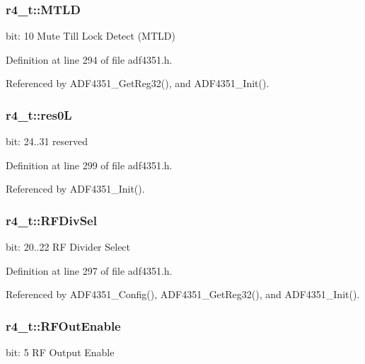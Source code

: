 \subsubsection[{\texorpdfstring{M\+T\+LD}{MTLD}}]{ r4\+\_\+t\+::\+M\+T\+LD}\hypertarget{structr4__t_a899217c98d1c1eca8780186c8e44470c}{}\label{structr4__t_a899217c98d1c1eca8780186c8e44470c}
bit\+: 10 Mute Till Lock Detect (M\+T\+LD) 

Definition at line 294 of file adf4351.\+h.



Referenced by A\+D\+F4351\+\_\+\+Get\+Reg32(), and A\+D\+F4351\+\_\+\+Init().

\subsubsection[{\texorpdfstring{res0L}{res0L}}]{ r4\+\_\+t\+::res0L}\hypertarget{structr4__t_a39447a9d51f096493dfc6d4a38bf3f9e}{}\label{structr4__t_a39447a9d51f096493dfc6d4a38bf3f9e}
bit\+: 24..31 reserved 

Definition at line 299 of file adf4351.\+h.



Referenced by A\+D\+F4351\+\_\+\+Init().

\subsubsection[{\texorpdfstring{R\+F\+Div\+Sel}{RFDivSel}}]{ r4\+\_\+t\+::\+R\+F\+Div\+Sel}\hypertarget{structr4__t_a6f0ef612a55877310aa2f07c9737e66b}{}\label{structr4__t_a6f0ef612a55877310aa2f07c9737e66b}
bit\+: 20..22 RF Divider Select 

Definition at line 297 of file adf4351.\+h.



Referenced by A\+D\+F4351\+\_\+\+Config(), A\+D\+F4351\+\_\+\+Get\+Reg32(), and A\+D\+F4351\+\_\+\+Init().

\subsubsection[{\texorpdfstring{R\+F\+Out\+Enable}{RFOutEnable}}]{ r4\+\_\+t\+::\+R\+F\+Out\+Enable}\hypertarget{structr4__t_adf8eb2db5ffd584ec6c5b5496a90f0f5}{}\label{structr4__t_adf8eb2db5ffd584ec6c5b5496a90f0f5}
bit\+: 5 RF Output Enable 

